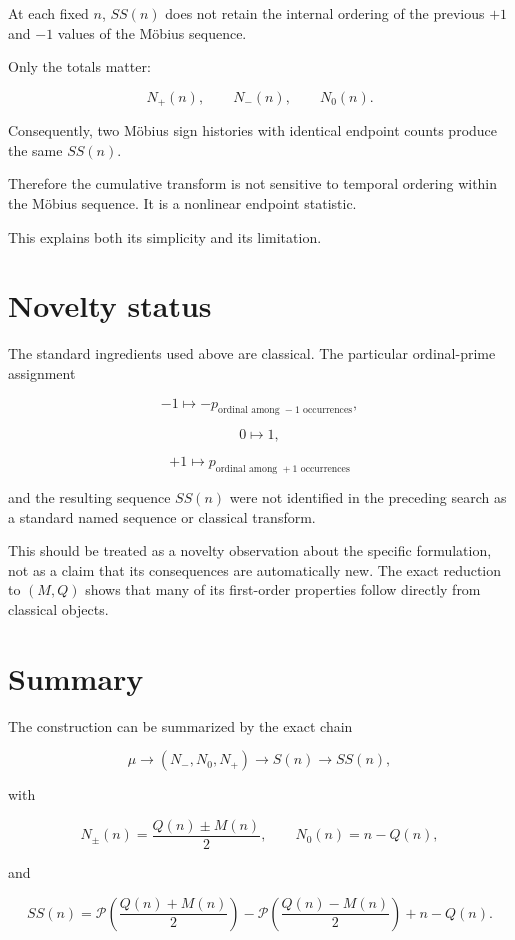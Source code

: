 \documentclass[11pt]{amsart}
\newcommand{\mob}{\mu}
\newcommand{\Mert}{M}
\newcommand{\Sq}{Q}
\newcommand{\PS}{\mathcal P}
\begin{document}
At each fixed $n$, $SS(n)$ does not retain the internal ordering of the previous $+1$ and $-1$ values of the M\"obius sequence.

Only the totals matter:

\[
N_+(n),\qquad N_-(n),\qquad N_0(n).
\]

Consequently, two M\"obius sign histories with identical endpoint counts produce the same $SS(n)$.

Therefore the cumulative transform is not sensitive to temporal ordering within the M\"obius sequence. It is a nonlinear endpoint statistic.

This explains both its simplicity and its limitation.

\section{Novelty status}

The standard ingredients used above are classical. The particular ordinal-prime assignment

\[
-1\mapsto -p_{\text{ordinal among }-1\text{ occurrences}},
\]

\[
0\mapsto1,
\]

\[
+1\mapsto p_{\text{ordinal among }+1\text{ occurrences}}
\]

and the resulting sequence $SS(n)$ were not identified in the preceding search as a standard named sequence or classical transform.

This should be treated as a novelty observation about the specific formulation, not as a claim that its consequences are automatically new. The exact reduction to $(M,Q)$ shows that many of its first-order properties follow directly from classical objects.

\section{Summary}

The construction can be summarized by the exact chain

\[
\mob
\longrightarrow
(N_-,N_0,N_+)
\longrightarrow
S(n)
\longrightarrow
SS(n),
\]

with

\[
N_\pm(n)=\frac{\Sq(n)\pm\Mert(n)}2,
\qquad
N_0(n)=n-\Sq(n),
\]

and

\[
\boxed{
SS(n)
=
\PS\!\left(\frac{\Sq(n)+\Mert(n)}2\right)
-
\PS\!\left(\frac{\Sq(n)-\Mert(n)}2\right)
+n-\Sq(n).
}
\]
\end{document}
